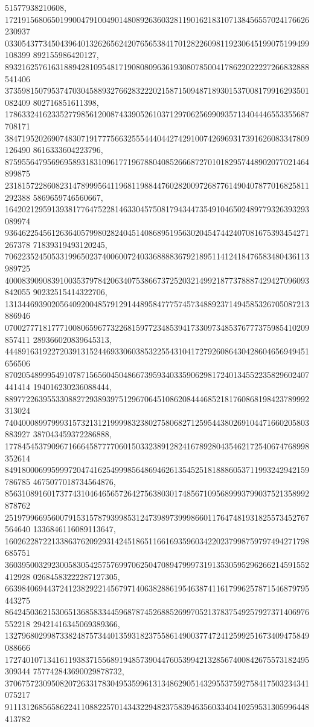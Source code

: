 \documentclass[12pt]{article}
\begin{document}
51577938210608, 
172191568065019900479100490148089263603281190162183107138456557024176626230937
033054377345043964013262656242076565384170128226098119230645199075199499108399
892155986420127, 
893216257616318894281095481719080809636193080785004178622022227266832888541406
373598150795374703045889327662832220215871509487189301537008179916293501082409
802716851611398, 
178633241623352779856120087433905261037129706256990935713404446553355687708171
384719520269074830719177756632555444044274291007426969317391626083347809126490
8616333604223796, 
875955647956969589318310961771967880408526668727010182957448902077021464899875
231815722860823147899956411968119884476028200972687761490407877016825811292388
5869659746560667, 
164202129591393817764752281463304575081794344735491046502489779326393293089974
936462254561263640579980282404514086895195630204547442407081675393454271267378
71839319493120245, 
706223524505331996502374006007240336888836792189511412418476583480436113989725
400083909083910035379784206340753866737252032149921877378887429427096093842055
90232515414322706, 
131344693902056409200485791291448958477757457348892371494585326705087213886946
070027771817771008065967732268159772348539417330973485376777375985410209857411
289366020839645313, 
444891631922720391315244693306038532255431041727926086430428604656949451656506
870205489995491078715656045048667395934033590629817240134552235829602407441414
194016230236088444, 
889772263955330882729389397512967064510862084446852181760868198423789992313024
740400089979993157321312199998323802758068271259544380269104471660205803883927
387043459372286888, 
177845453790967166645877770601503323891282416789280435462172540674768998352614
849180006995999720474162549998564869462613545251818886053711993242942159786785
4675077018734564876, 
856310891601737743104646565726427563803017485671095689993799037521358992878762
251979966956007915315787939985312473989739998660117647481931825573452767564640
1336846116089113647, 
160262287221338637620929314245186511661693596034220237998759797494271798685751
360395003292300583054257576997062504708947999731913530595296266214591552412928
02684583222287127305, 
663984069443724123829221456797140638288619546387411617996257871546879795443275
864245036215306513685833445968787452688526997052137837549257927371406976552218
29421416345069389366, 
132796802998733824875734401359318237558614900377472412599251673409475849088666
172740107134161193837155689194857390447605399421328567400842675573182495309344
757742843690029878732, 
370675723095082072633178304953599613134862905143295537592758417503234341075217
911131268565862241108822570143432294823758394635603340410259531305996448413782
\end{document}
